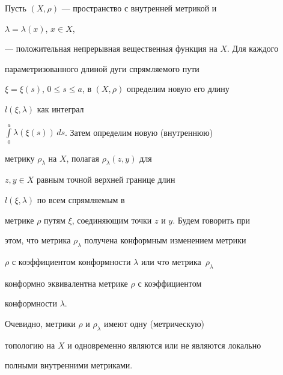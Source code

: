 \begin{defns}


\label{int}


Пусть $(X,\rho)$ --- пространство с внутренней метрикой и


$\lambda = \lambda(x)$, $x \in X$,


--- положительная непрерывная вещественная функция на $X$. Для каждого


параметризованного длиной дуги спрямляемого пути


$\xi = \xi(s)$, $0 \leq s \leq a$, в $(X,\rho)$ определим новую его длину


$l(\xi,\lambda )$ как интеграл


$\int\limits_{0}^{a}{\lambda (\xi(s))}\,ds$. Затем определим новую (внутреннюю)


метрику $\rho_{\lambda}$ на $X$, полагая $\rho_{\lambda}(z,y)$ для


$z,y \in X$ равным точной верхней границе длин


$l(\xi,\lambda )$ по всем спрямляемым в


метрике $\rho$ путям $\xi$, соединяющим точки $z$ и $y$. Будем говорить при


этом, что метрика $\rho_{\lambda}$ получена конформным изменением метрики


$\rho$ с коэффициентом конформности $\lambda$ или что метрика~$\rho_{\lambda}$ 


конформно эквивалентна метрике $\rho$ с коэффициентом


конформности $\lambda$.


\end{defns}





\begin{notes}


\label{l}


Очевидно, метрики $\rho$ и $\rho_{\lambda}$ имеют одну (метрическую)


топологию на $X$ и одновременно являются или не являются локально


полными внутренними метриками.


\end{notes}





